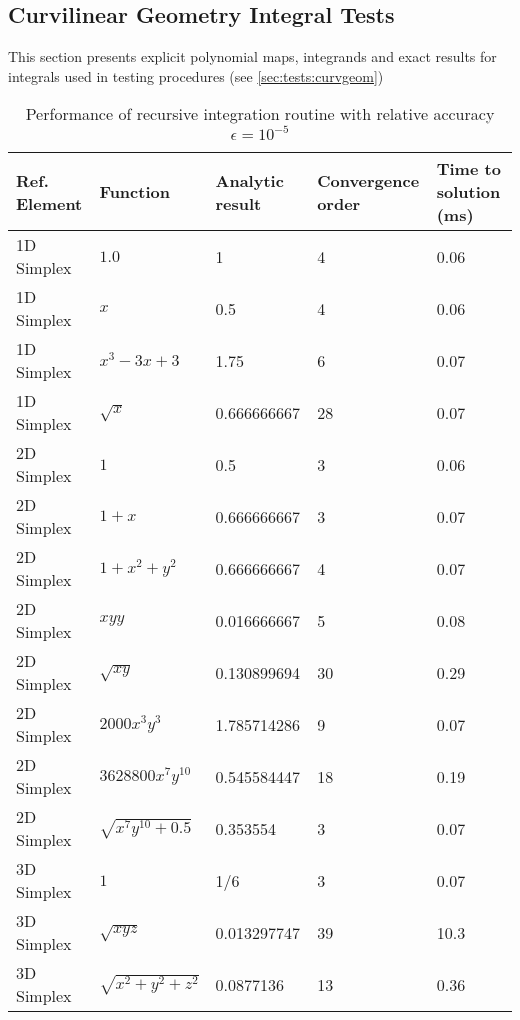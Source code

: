 \subsection{Curvilinear Geometry Integral Tests}
\label{appendix-geometry-tests-integral}
This section presents explicit polynomial maps, integrands and exact results for integrals used in \curvgeom{} testing procedures (see \cref{sec:tests:curvgeom})


\begin{table} [H]
\centering
\begin{tabular}{| l | l | l | l | l |}
\hline
Ref. Element & Function       	& Analytic result   & Convergence order & Time to solution (ms) \\ \hline
1D Simplex & $1.0$               	& 1                 & 4                 & 0.06 \\ \hline
1D Simplex & $x$                  	& 0.5               & 4                 & 0.06 \\ \hline
1D Simplex & $x^3 - 3x + 3$	& 1.75              & 6                 & 0.07 \\ \hline
1D Simplex & $\sqrt{x}$		& 0.666666667       & 28                & 0.07 \\ \hline

2D Simplex & $1$	                			& 0.5               & 3                 & 0.06 \\ \hline
2D Simplex & $1 + x$                  			& 0.666666667       & 3                 & 0.07 \\ \hline
2D Simplex & $1 + x^2 + y^2$        	  	& 0.666666667       & 4                 & 0.07 \\ \hline
2D Simplex & $xyy$              			& 0.016666667       & 5                 & 0.08 \\ \hline
2D Simplex & $\sqrt{xy}$              			& 0.130899694       & 30                & 0.29 \\ \hline
2D Simplex & $2000 x^3 y^3$   	   	& 1.785714286       & 9                 & 0.07 \\ \hline
2D Simplex & $3628800 x^7 y^{10}$		& 0.545584447       & 18                & 0.19 \\ \hline
2D Simplex & $\sqrt{x^7 y^{10} + 0.5}$	& 0.353554             & 3                 & 0.07 \\ \hline

3D Simplex & $1$                    			& 1/6               		& 3                 & 0.07 \\ \hline
3D Simplex & $\sqrt{xyz}$            			& 0.013297747       & 39                & 10.3 \\ \hline
3D Simplex & $\sqrt{x^2 + y^2 + z^2}$	& 0.0877136        	& 13                & 0.36 \\ \hline
\end{tabular}
\caption{Performance of recursive integration routine with relative accuracy $\epsilon = 10^{-5}$}
\label{appendix:tests:quadintegrator:performance}
\end{table}


